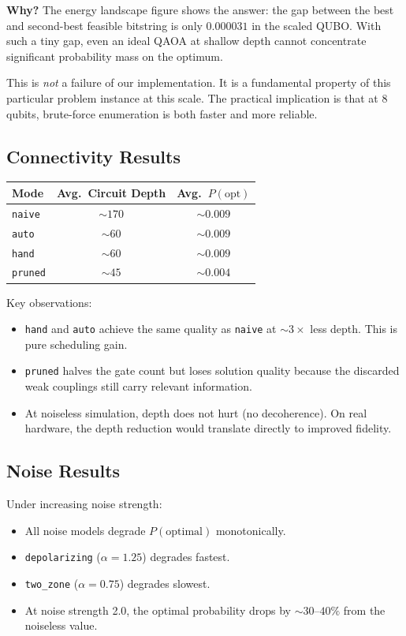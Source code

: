 \documentclass[12pt, a4paper]{article}
\begin{document}
\textbf{Why?} The energy landscape figure shows the answer: the gap between the
best and second-best feasible bitstring is only $0.000031$ in the scaled QUBO.
With such a tiny gap, even an ideal QAOA at shallow depth cannot concentrate
significant probability mass on the optimum.

This is \textit{not} a failure of our implementation. It is a fundamental
property of this particular problem instance at this scale. The practical
implication is that at 8 qubits, brute-force enumeration is both faster and
more reliable.

\subsection{Connectivity Results}

\begin{center}
\begin{tabular}{lcc}
\toprule
\textbf{Mode} & \textbf{Avg.\ Circuit Depth} & \textbf{Avg.\ $P(\text{opt})$} \\
\midrule
\texttt{naive} & $\sim170$ & $\sim0.009$ \\
\texttt{auto} & $\sim60$ & $\sim0.009$ \\
\texttt{hand} & $\sim60$ & $\sim0.009$ \\
\texttt{pruned} & $\sim45$ & $\sim0.004$ \\
\bottomrule
\end{tabular}
\end{center}

Key observations:
\begin{itemize}
    \item \texttt{hand} and \texttt{auto} achieve the same quality as \texttt{naive} at $\sim3\times$ less depth. This is pure scheduling gain.
    \item \texttt{pruned} halves the gate count but loses solution quality because the discarded weak couplings still carry relevant information.
    \item At noiseless simulation, depth does not hurt (no decoherence). On real hardware, the depth reduction would translate directly to improved fidelity.
\end{itemize}

\subsection{Noise Results}

Under increasing noise strength:
\begin{itemize}
    \item All noise models degrade $P(\text{optimal})$ monotonically.
    \item \texttt{depolarizing} ($\alpha = 1.25$) degrades fastest.
    \item \texttt{two\_zone} ($\alpha = 0.75$) degrades slowest.
    \item At noise strength 2.0, the optimal probability drops by $\sim30$--$40\%$ from the noiseless value.
\end{itemize}
\end{document}
